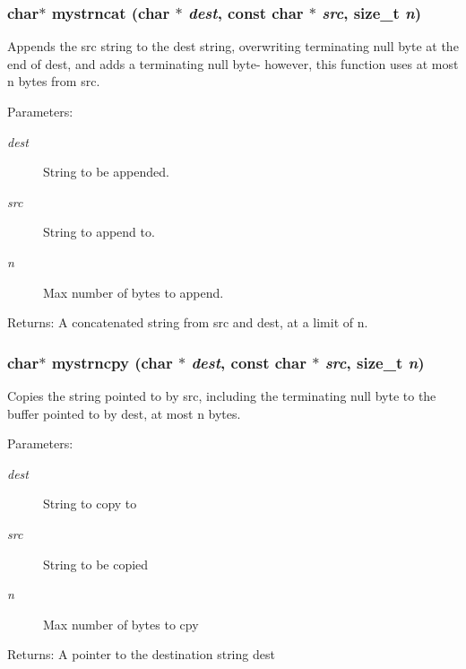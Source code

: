 \subsubsection{\setlength{\rightskip}{0pt plus 5cm}char$\ast$ mystrncat (char $\ast$ {\em dest}, const char $\ast$ {\em src}, size\_\-t {\em n})}\label{mystring_8c_36e5091b981e9da826d41e7977b8e507}


Appends the src string to the dest string, overwriting terminating null byte at the end of dest, and adds a terminating null byte- however, this function uses at most n bytes from src. 

\begin{Desc}
\item[Parameters:]
\begin{description}
\item[{\em dest}]String to be appended. \item[{\em src}]String to append to. \item[{\em n}]Max number of bytes to append. \end{description}
\end{Desc}
\begin{Desc}
\item[Returns:]A concatenated string from src and dest, at a limit of n. \end{Desc}
\subsubsection{\setlength{\rightskip}{0pt plus 5cm}char$\ast$ mystrncpy (char $\ast$ {\em dest}, const char $\ast$ {\em src}, size\_\-t {\em n})}\label{mystring_8c_86b7a78bb3914b2c6e6022b482c4a534}


Copies the string pointed to by src, including the terminating null byte to the buffer pointed to by dest, at most n bytes. 

\begin{Desc}
\item[Parameters:]
\begin{description}
\item[{\em dest}]String to copy to \item[{\em src}]String to be copied \item[{\em n}]Max number of bytes to cpy \end{description}
\end{Desc}
\begin{Desc}
\item[Returns:]A pointer to the destination string dest \end{Desc}
